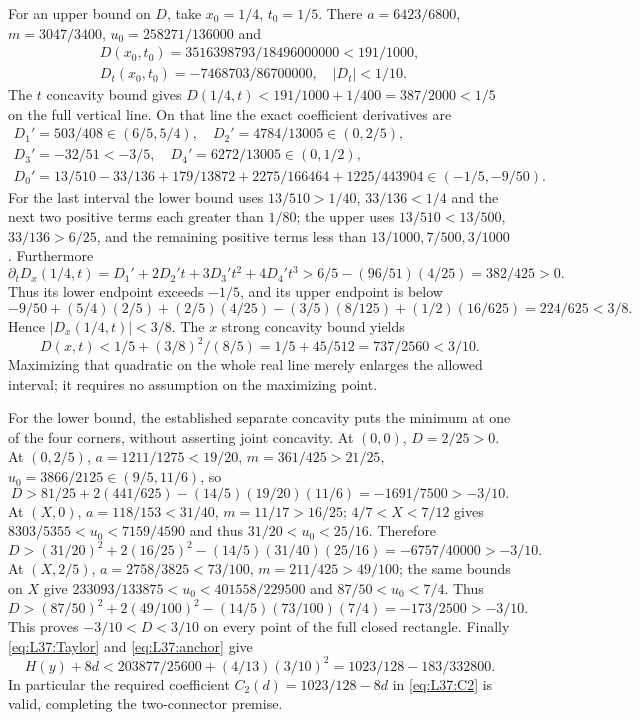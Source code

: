For an upper bound on $D$, take $x_0=1/4$, $t_0=1/5$.
There $a=6423/6800$, $m=3047/3400$, $u_0=258271/136000$ and
\[
\begin{gathered}
D(x_0,t_0)=3516398793/18496000000<191/1000,\\
D_t(x_0,t_0)=-7468703/86700000,\quad |D_t|<1/10.
\end{gathered}
\]
The $t$ concavity bound gives
$D(1/4,t)<191/1000+1/400=387/2000<1/5$ on the full vertical line.
On that line the exact coefficient derivatives are
\[
\begin{gathered}
D_1'=503/408\in(6/5,5/4),\quad D_2'=4784/13005\in(0,2/5),\\
D_3'=-32/51<-3/5,\quad D_4'=6272/13005\in(0,1/2),\\
D_0'=13/510-33/136+179/13872+2275/166464+1225/443904
\in(-1/5,-9/50).
\end{gathered}
\]
For the last interval the lower bound uses $13/510>1/40$,
$33/136<1/4$ and the next two positive terms each greater than $1/80$;
the upper uses $13/510<13/500$, $33/136>6/25$, and the remaining
positive terms less than $13/1000,7/500,3/1000$.
Furthermore
\[
\partial_tD_x(1/4,t)=D_1'+2D_2't+3D_3't^2+4D_4't^3
>6/5-(96/51)(4/25)=382/425>0.
\]
Thus its lower endpoint exceeds $-1/5$, and its upper endpoint is below
\[
-9/50+(5/4)(2/5)+(2/5)(4/25)-(3/5)(8/125)+(1/2)(16/625)
=224/625<3/8.
\]
Hence $|D_x(1/4,t)|<3/8$. The $x$ strong concavity bound yields
\[
D(x,t)<1/5+(3/8)^2/(8/5)=1/5+45/512=737/2560<3/10.
\]
Maximizing that quadratic on the whole real line merely enlarges the
allowed interval; it requires no assumption on the maximizing point.

For the lower bound, the established separate concavity puts the minimum
at one of the four corners, without asserting joint concavity.
At $(0,0)$, $D=2/25>0$.
At $(0,2/5)$,
$a=1211/1275<19/20$, $m=361/425>21/25$,
$u_0=3866/2125\in(9/5,11/6)$, so
\[
D>81/25+2(441/625)-(14/5)(19/20)(11/6)
=-1691/7500>-3/10.
\]
At $(X,0)$, $a=118/153<31/40$, $m=11/17>16/25$;
$4/7<X<7/12$ gives
$8303/5355<u_0<7159/4590$ and thus $31/20<u_0<25/16$.
Therefore
\[
D>(31/20)^2+2(16/25)^2-(14/5)(31/40)(25/16)
=-6757/40000>-3/10.
\]
At $(X,2/5)$, $a=2758/3825<73/100$, $m=211/425>49/100$;
the same bounds on $X$ give
$233093/133875<u_0<401558/229500$ and $87/50<u_0<7/4$.
Thus
\[
D>(87/50)^2+2(49/100)^2-(14/5)(73/100)(7/4)
=-173/2500>-3/10.
\]
This proves $-3/10<D<3/10$ on every point of the full closed rectangle.
Finally \eqref{eq:L37:Taylor} and \eqref{eq:L37:anchor} give
\[
H(y)+8d<203877/25600+(4/13)(3/10)^2
=1023/128-183/332800.
\]
In particular the required coefficient $C_2(d)=1023/128-8d$ in
\eqref{eq:L37:C2} is valid, completing the two-connector premise.
